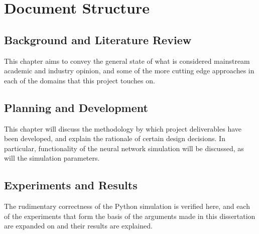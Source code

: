 
%

\section{Document Structure}

\subsection*{Background and Literature Review}
This chapter aims to convey the general state of what is considered mainstream
academic and industry opinion, and some of the more cutting edge approaches in
each of the domains that this project touches on.

\subsection*{Planning and Development}
This chapter will discuss the methodology by which project deliverables have
been developed, and explain the rationale of certain design decisions. In
particular, functionality of the neural network simulation will be discussed, as
will the simulation parameters.

\subsection*{Experiments and Results}
The rudimentary correctness of the Python simulation is verified here, and each
of the experiments that form the basis of the arguments made in this
dissertation are expanded on and their results are explained.

